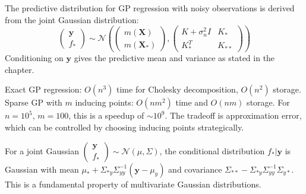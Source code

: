 \begin{solution}
The predictive distribution for GP regression with noisy observations is derived from the joint Gaussian distribution:
\[
\begin{pmatrix} \mathbf{y} \\ f_* \end{pmatrix} \sim \mathcal{N}\left(\begin{pmatrix} m(\mathbf{X}) \\ m(\mathbf{X}_*) \end{pmatrix}, \begin{pmatrix} K + \sigma_n^2 I & K_* \\ K_*^T & K_{**} \end{pmatrix}\right)
\]
Conditioning on $\mathbf{y}$ gives the predictive mean and variance as stated in the chapter.
\end{solution}

\begin{solution}
Exact GP regression: $O(n^3)$ time for Cholesky decomposition, $O(n^2)$ storage. Sparse GP with $m$ inducing points: $O(nm^2)$ time and $O(nm)$ storage. For $n = 10^5$, $m = 100$, this is a speedup of $\sim 10^9$. The tradeoff is approximation error, which can be controlled by choosing inducing points strategically.
\end{solution}

\begin{solution}
For a joint Gaussian $\begin{pmatrix} \mathbf{y} \\ f_* \end{pmatrix} \sim \mathcal{N}(\mu, \Sigma)$, the conditional distribution $f_* | \mathbf{y}$ is Gaussian with mean $\mu_* + \Sigma_{*y}\Sigma_{yy}^{-1}(\mathbf{y} - \mu_y)$ and covariance $\Sigma_{**} - \Sigma_{*y}\Sigma_{yy}^{-1}\Sigma_{y*}$. This is a fundamental property of multivariate Gaussian distributions.
\end{solution}